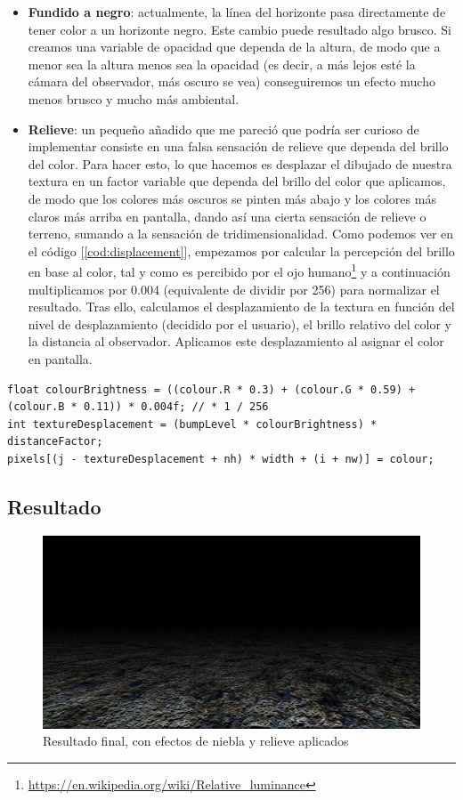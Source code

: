 \begin{itemize}
	\item \textbf{Fundido a negro}: actualmente, la línea del horizonte pasa directamente de tener color a un horizonte negro. Este cambio puede resultado algo brusco. Si creamos una variable de opacidad que dependa de la altura, de modo que a menor sea la altura menos sea la opacidad (es decir, a más lejos esté la cámara del observador, más oscuro se vea) conseguiremos un efecto mucho menos brusco y mucho más ambiental. 
	\item \textbf{Relieve}: un pequeño añadido que me pareció que podría ser curioso de implementar consiste en una falsa sensación de relieve que dependa del brillo del color. Para hacer esto, lo que hacemos es desplazar el dibujado de nuestra textura en un factor variable que dependa del brillo del color que aplicamos, de modo que los colores más oscuros se pinten más abajo y los colores más claros más arriba en pantalla, dando así una cierta sensación de relieve o terreno, sumando a la sensación de tridimensionalidad. Como podemos ver en el código [\ref{cod:displacement}], empezamos por calcular la percepción del brillo en base al color, tal y como es percibido por el ojo humano\footnote{\url{https://en.wikipedia.org/wiki/Relative_luminance}} y a continuación multiplicamos por 0.004 (equivalente de dividir por 256) para normalizar el resultado. Tras ello, calculamos el desplazamiento de la textura en función del nivel de desplazamiento (decidido por el usuario), el brillo relativo del color y la distancia al observador. Aplicamos este desplazamiento al asignar el color en pantalla.
\end{itemize}

\begin{lstlisting}[style=C-color, caption={Código para calcular el desplamiento de la textura}, label=cod:displacement]
float colourBrightness = ((colour.R * 0.3) + (colour.G * 0.59) + (colour.B * 0.11)) * 0.004f; // * 1 / 256
int textureDesplacement = (bumpLevel * colourBrightness) * distanceFactor;
pixels[(j - textureDesplacement + nh) * width + (i + nw)] = colour;
\end{lstlisting}

\subsection{Resultado}

\begin{figure}[h]
	\centering
	\includegraphics[width=12cm]{archivos/planes3}
	\caption{Resultado final, con efectos de niebla y relieve aplicados}
	\label{fig:planes3}
\end{figure}

